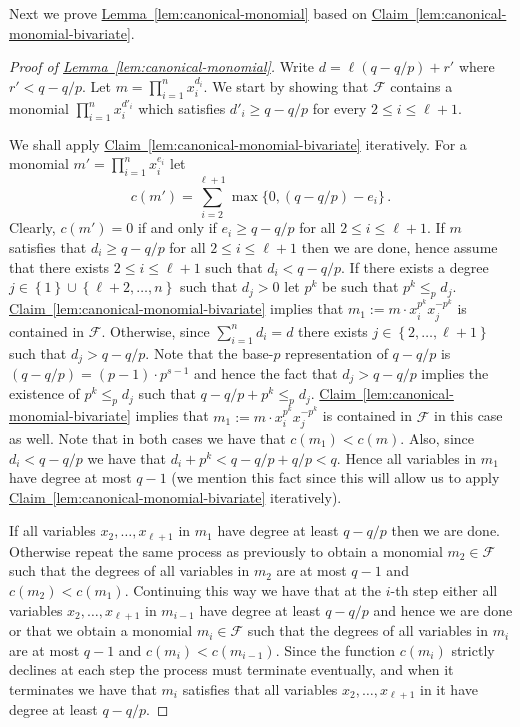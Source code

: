\documentclass[10pt]{article}
\theoremstyle{definition}
\numberwithin{equation}{section}
\newcommand{\expref}[2]{\texorpdfstring{\hyperref[#2]{#1~\ref{#2}}}{#1~\ref{#2}}}
\newcommand{\cF}{{\mathcal{F}}}
\newcommand{\set}[1]{\left\{{#1}\right\}}
\begin{document}
Next we prove \expref{Lemma}{lem:canonical-monomial} based on \expref{Claim}{lem:canonical-monomial-bivariate}.

\begin{proof}[Proof of \expref{Lemma}{lem:canonical-monomial}]
Write $d = \ell(q-q/p) + r'$ where $r' <q-q/p$. Let $m = \prod_{i=1}^{n} x_i^{d_i}$.
We start by showing that $\cF$ contains a monomial $\prod_{i=1}^{n} x_i^{d'_i}$ which satisfies $d'_i \geq q-q/p$ for every $2 \leq i \leq \ell+1$.

We shall apply \expref{Claim}{lem:canonical-monomial-bivariate} iteratively. For a monomial $m' = \prod_{i=1}^n x_i ^{e_i}$
let  $$c(m') = \sum_{i=2}^{\ell+1} \max\{0,(q-q/p)-e_i\}\,.$$ Clearly, $c(m') =0$ if and only if $e_i \geq q-q/p$ for all $2 \leq i \leq \ell+1$.
If $m$ satisfies that $d_i \geq q-q/p$ for all $2 \leq i \leq \ell+1$
 then we are done, hence assume that there exists $2 \leq i \leq \ell+1$ such that $d_i < q-q/p$.
If there exists a degree $j \in \set{1}\cup \set{\ell+2,\ldots,n}$ such that $d_j >0$ let $p^k$ be such that $p^k \leq_p d_j$.
\expref{Claim}{lem:canonical-monomial-bivariate} implies that $m_1 := m\cdot x_i^{p^k} x_j^{-p^k}$ is contained in $\cF$.  Otherwise,
since $ \sum_{i=1}^{n} d_i  = d$ there exists $j \in \set{2,\ldots,\ell+1}$ such that $d_j > q-q/p$. Note that the base-$p$ representation of $q-q/p$
is $(q-q/p) =  (p-1)\cdot p^{s-1}$ and hence the fact that $d_j > q-q/p$ implies the existence of $p^k \leq_p d_j$ such that
$q-q/p + p^k \leq_p d_j$. \expref{Claim}{lem:canonical-monomial-bivariate} implies that $m_1 := m\cdot x_i^{p^k} x_j^{-p^k}$  is contained in $\cF$ in this case as well.
Note that in both cases we have that $c(m_1) < c(m)$. Also, since $d_i < q-q/p$ we have that $d_i + p^k < q-q/p + q/p <q$. Hence all variables in $m_1$ have degree at most $q-1$ (we mention this fact since this will allow us to apply \expref{Claim}{lem:canonical-monomial-bivariate} iteratively).

If all variables $x_2,\ldots,x_{\ell+1}$ in $m_1$ have degree at least $q-q/p$
then we are done. Otherwise repeat the same process as previously to obtain a monomial $m_2 \in \cF$
such that the degrees of all variables in $m_2$ are at most $q-1$ and  $c(m_2) < c(m_1)$.
Continuing this way we have that
at the $i$-th step either all variables $x_2,\ldots,x_{\ell+1}$ in $m_{i-1}$ have degree at least $q-q/p$ and hence we are done
 or that we obtain a monomial $m_i \in \cF$ such that the degrees of all variables
in $m_i$ are at most $q-1$ and $c(m_i) < c(m_{i-1})$. Since the function $c(m_i)$ strictly declines at each step the process
must terminate eventually, and when it terminates we have that  $m_{i}$ satisfies that all variables $x_2, \ldots,x_{\ell+1}$ in it have degree at least $q-q/p$.


\end{proof}
\end{document}
